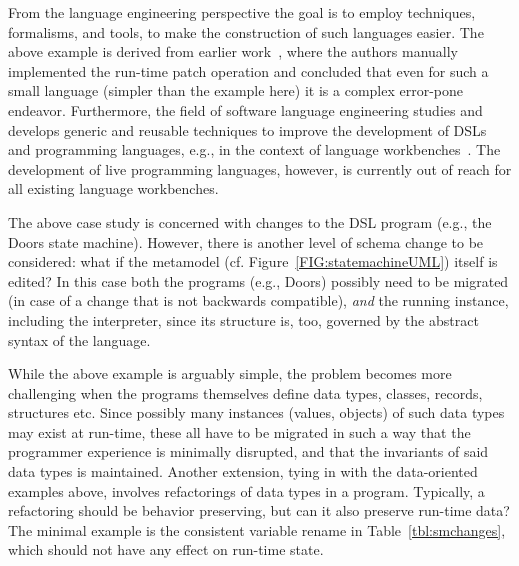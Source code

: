 \documentclass[english,crc]{programming}
\begin{document}
From the language engineering perspective the goal is to employ techniques, formalisms, and tools, to make the construction of such languages easier. The above example is derived from earlier work~\cite{vanRozen19}, where the authors manually implemented the run-time patch operation and concluded that even for such a small language (simpler than the example here) it is a complex error-pone endeavor. Furthermore, the field of software language engineering studies and develops generic and reusable techniques to improve the development of DSLs and programming languages, e.g., in the context of language workbenches~\cite{ERDWEG201524}. The development of live programming languages, however, is currently out of reach for all existing language workbenches.

The above case study is concerned with changes to the DSL program (e.g., the Doors state machine). However, there is another level of schema change to be considered: what if the metamodel (cf. Figure~\ref{FIG:statemachineUML}) itself is edited? In this case both the programs (e.g., Doors) possibly need to be migrated (in case of a change that is not backwards compatible), \textit{and} the running instance, including the interpreter, since its structure is, too, governed by the abstract syntax of the language.


While the above example is arguably simple, the problem becomes more challenging when the programs themselves define data types, classes, records, structures etc. Since possibly many instances (values, objects) of such data types may exist at run-time, these all have to be migrated in such a way that the programmer experience is minimally disrupted, and that the invariants of said data types is maintained.
Another extension, tying in with the data-oriented examples above, involves refactorings of data types in a program. Typically, a refactoring should be behavior preserving, but can it also preserve run-time data? The minimal example is the consistent variable rename in Table~\ref{tbl:smchanges}, which should not have any effect on run-time state.
\end{document}
